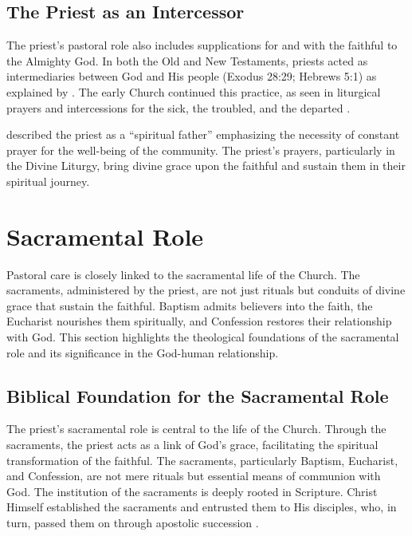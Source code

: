 \documentclass[12pt,doc]{apa7}   	%
\begin{document}
\subsection{The Priest as an Intercessor}

The priest’s pastoral role also includes supplications for and with the faithful to the Almighty God. In both the Old and New Testaments, priests acted as intermediaries between God and His people (Exodus 28:29; Hebrews 5:1) as explained by \citet{hgb-youssef_hebrews}. The early Church continued this practice, as seen in liturgical prayers and intercessions for the sick, the troubled, and the departed \citep{priesthood_shenouda}.

\citet{priests_zacharias} described the priest as a ``spiritual father'' emphasizing the necessity of constant prayer for the well-being of the community. The priest’s prayers, particularly in the Divine Liturgy, bring divine grace upon the faithful and sustain them in their spiritual journey.

\section{Sacramental Role}\label{sacramental}
Pastoral care is closely linked to the sacramental life of the Church. The sacraments, administered by the priest, are not just rituals but conduits of divine grace that sustain the faithful. Baptism admits believers into the faith, the Eucharist nourishes them spiritually, and Confession restores their relationship with God. This section highlights the theological foundations of the sacramental role and its significance in the God-human relationship.

\subsection{Biblical Foundation for the Sacramental Role}

The priest’s sacramental role is central to the life of the Church. Through the sacraments, the priest acts as a link of God’s grace, facilitating the spiritual transformation of the faithful. The sacraments, particularly Baptism, Eucharist, and Confession, are not mere rituals but essential means of communion with God. The institution of the sacraments is deeply rooted in Scripture. Christ Himself established the sacraments and entrusted them to His disciples, who, in turn, passed them on through apostolic succession \citep{holmes_apostolic_fathers}. 
\end{document}
